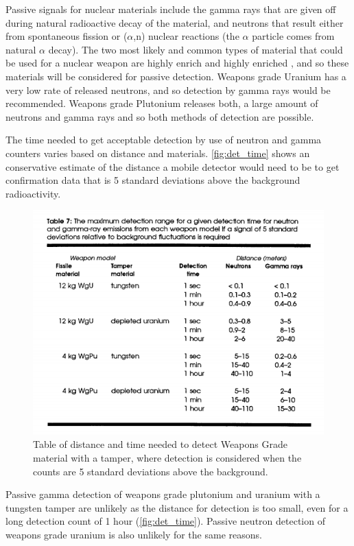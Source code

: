 \documentclass{report}
\begin{document}
Passive signals for nuclear materials include the gamma rays that are given off during natural radioactive decay of the material, and neutrons that result either from spontaneous fission or (\(\alpha\),n) nuclear reactions (the \(\alpha\) particle comes from natural \(\alpha\) decay). The two most likely and common types of material that could be used for a nuclear weapon are highly enrich  and highly enriched , and so these materials will be considered for passive detection. Weapons grade Uranium has a very low rate of released neutrons, and so detection by gamma rays would be recommended. Weapons grade Plutonium releases both, a large amount of neutrons and gamma rays and so both methods of detection are possible. 

The time needed to get acceptable detection by use of neutron and gamma counters varies based on distance and materials. \autoref{fig:det_time} shows an conservative estimate of the distance a mobile detector would need to be to get confirmation data that is 5 standard deviations above the background radioactivity. 


\begin{figure}[h]
 \centering
 \includegraphics[trim = 0cm 0cm 0cm 2cm, clip,scale=0.6]{./figures/det_time.png}
   \caption{Table of distance and time needed to detect Weapons Grade  material with a tamper, where detection is considered when the counts are 5 standard deviations above the background. \cite{Fetter1990}}
     \label{fig:det_time}
\end{figure}


Passive gamma detection of weapons grade plutonium and uranium with a tungsten tamper are unlikely as the distance for detection is too small, even for a long detection count of 1 hour (\autoref{fig:det_time}). Passive neutron detection of weapons grade uranium is also unlikely for the same reasons. 
\end{document}
